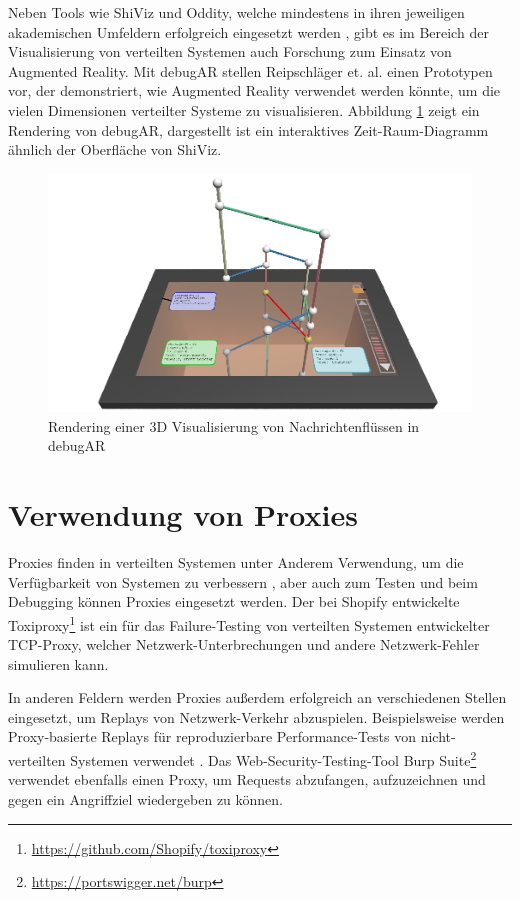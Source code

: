 \documentclass[12pt,a4paper]{report}
\begin{document}
Neben Tools wie ShiViz und Oddity, welche mindestens in ihren jeweiligen akademischen Umfeldern erfolgreich eingesetzt werden
\cite{ShiViz_usage_study, oddity_usage_in_education}, gibt es im Bereich der Visualisierung von verteilten Systemen auch Forschung
zum Einsatz von Augmented Reality. Mit debugAR stellen Reipschläger et. al. \cite{debugAR_AR_debugger} einen Prototypen vor, der
demonstriert, wie Augmented Reality verwendet werden könnte, um die vielen Dimensionen verteilter Systeme zu visualisieren.
Abbildung \ref{fig:debugAR} zeigt ein Rendering von debugAR, dargestellt ist ein interaktives Zeit-Raum-Diagramm ähnlich der
Oberfläche von ShiViz.

\begin{figure}[H]
	\centering
	\includegraphics[width=\linewidth]{img/debugAR_rendering.png}
	\caption{Rendering einer 3D Visualisierung von Nachrichtenflüssen in debugAR \cite{debugAR_AR_debugger}}
	\label{fig:debugAR}
\end{figure}

\section{Verwendung von Proxies}
\label{chap:proxies}
Proxies finden in verteilten Systemen unter Anderem Verwendung, um die Verfügbarkeit von Systemen zu verbessern
\cite{distributed_systems_concepts_and_design}, aber auch zum Testen und beim Debugging können Proxies eingesetzt werden. Der bei
Shopify entwickelte Toxiproxy\footnote{\label{foot:toxiproxy}\url{https://github.com/Shopify/toxiproxy}} ist ein für das
Failure-Testing von verteilten Systemen entwickelter TCP-Proxy, welcher Netzwerk-Unterbrechungen und andere Netzwerk-Fehler
simulieren kann.

In anderen Feldern werden Proxies außerdem erfolgreich an verschiedenen Stellen eingesetzt, um Replays von Netzwerk-Verkehr
abzuspielen. Beispielsweise werden Proxy-basierte Replays für reproduzierbare Performance-Tests von nicht-verteilten Systemen
verwendet \cite{performace_replay_testing}. Das Web-Security-Testing-Tool Burp Suite\footnote{\url{https://portswigger.net/burp}}
verwendet ebenfalls einen Proxy, um Requests abzufangen, aufzuzeichnen und gegen ein Angriffziel wiedergeben zu können.
\end{document}

